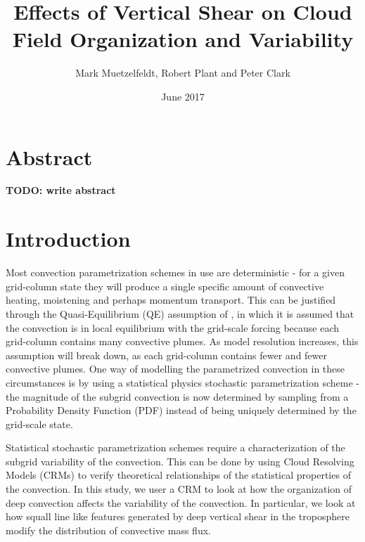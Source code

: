 \documentclass[11pt,a4paper]{article}
\title{Effects of Vertical Shear on Cloud Field Organization and Variability}
\author{Mark Muetzelfeldt, Robert Plant and  Peter Clark}
\date{June 2017}
\newcommand\todo[1]{\textbf{TODO: #1}}
\begin{document}
\maketitle
\section*{Abstract}
\todo{write abstract}

\section{Introduction}

Most convection parametrization schemes in use are deterministic - for a given grid-column state they will produce a single specific amount of convective heating, moistening and perhaps momentum transport. This can be justified through the Quasi-Equilibrium (QE) assumption of \cite{arakawa1974interaction}, in which it is assumed that the convection is in local equilibrium with the grid-scale forcing because each grid-column contains many convective plumes. As model resolution increases, this assumption will break down, as each grid-column contains fewer and fewer convective plumes. One way of modelling the parametrized convection in these circumstances is by using a statistical physics stochastic parametrization scheme \parencite{berner2017stochastic} - the magnitude of the subgrid convection is now determined by sampling from a Probability Density Function (PDF) instead of being uniquely determined by the grid-scale state.

Statistical stochastic parametrization schemes require a characterization of the subgrid variability of the convection. This can be done by using Cloud Resolving Models (CRMs) to verify theoretical relationships of the statistical properties of the convection. In this study, we user a CRM to look at how the organization of deep convection affects the variability of the convection. In particular, we look at how squall line like features generated by deep vertical shear in the troposphere modify the distribution of convective mass flux.
\end{document}
